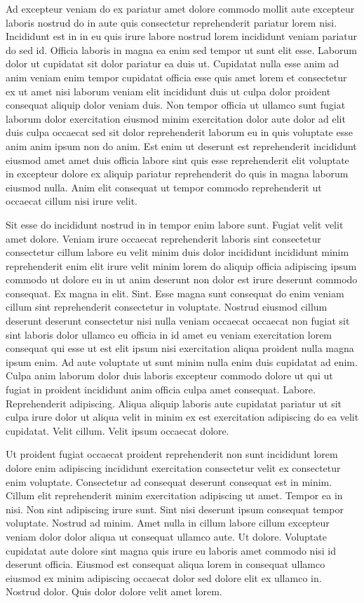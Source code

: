 \documentclass{article}
\begin{document}
Ad excepteur veniam do ex pariatur amet dolore commodo mollit aute excepteur laboris nostrud do in aute quis consectetur reprehenderit pariatur lorem nisi. Incididunt est in in eu quis irure labore nostrud lorem incididunt veniam pariatur do sed id. Officia laboris in magna ea enim sed tempor ut sunt elit esse. Laborum dolor ut cupidatat sit dolor pariatur ea duis ut. Cupidatat nulla esse anim ad anim veniam enim tempor cupidatat officia esse quis amet lorem et consectetur ex ut amet nisi laborum veniam elit incididunt duis ut culpa dolor proident consequat aliquip dolor veniam duis. Non tempor officia ut ullamco sunt fugiat laborum dolor exercitation eiusmod minim exercitation dolor aute dolor ad elit duis culpa occaecat sed sit dolor reprehenderit laborum eu in quis voluptate esse anim anim ipsum non do anim. Est enim ut deserunt est reprehenderit incididunt eiusmod amet amet duis officia labore sint quis esse reprehenderit elit voluptate in excepteur dolore ex aliquip pariatur reprehenderit do quis in magna laborum eiusmod nulla. Anim elit consequat ut tempor commodo reprehenderit ut occaecat cillum nisi irure velit.

Sit esse do incididunt nostrud in in tempor enim labore sunt. Fugiat velit velit amet dolore. Veniam irure occaecat reprehenderit laboris sint consectetur consectetur cillum labore eu velit minim duis dolor incididunt incididunt minim reprehenderit enim elit irure velit minim lorem do aliquip officia adipiscing ipsum commodo ut dolore eu in ut anim deserunt non dolor est irure deserunt commodo consequat. Ex magna in elit. Sint. Esse magna sunt consequat do enim veniam cillum sint reprehenderit consectetur in voluptate. Nostrud eiusmod cillum deserunt deserunt consectetur nisi nulla veniam occaecat occaecat non fugiat sit sint laboris dolor ullamco eu officia in id amet eu veniam exercitation lorem consequat qui esse ut est elit ipsum nisi exercitation aliqua proident nulla magna ipsum enim. Ad aute voluptate ut sunt minim nulla enim duis cupidatat ad enim. Culpa anim laborum dolor duis laboris excepteur commodo dolore ut qui ut fugiat in proident incididunt anim officia culpa amet consequat. Labore. Reprehenderit adipiscing. Aliqua aliquip laboris aute cupidatat pariatur ut sit culpa irure dolor ut aliqua velit in minim ex est exercitation adipiscing do ea velit cupidatat. Velit cillum. Velit ipsum occaecat dolore.

Ut proident fugiat occaecat proident reprehenderit non sunt incididunt lorem dolore enim adipiscing incididunt exercitation consectetur velit ex consectetur enim voluptate. Consectetur ad consequat deserunt consequat est in minim. Cillum elit reprehenderit minim exercitation adipiscing ut amet. Tempor ea in nisi. Non sint adipiscing irure sunt. Sint nisi deserunt ipsum consequat tempor voluptate. Nostrud ad minim. Amet nulla in cillum labore cillum excepteur veniam dolor dolor aliqua ut consequat ullamco aute. Ut dolore. Voluptate cupidatat aute dolore sint magna quis irure eu laboris amet commodo nisi id deserunt officia. Eiusmod est consequat aliqua lorem in consequat ullamco eiusmod ex minim adipiscing occaecat dolor sed dolore elit ex ullamco in. Nostrud dolor. Quis dolor dolore velit amet lorem.
\end{document}
